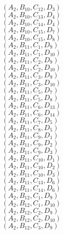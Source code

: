 \documentclass[14pt]{article}
\begin{document}
    $({A}_{2}, {B}_{10}, {C}_{12}, {D}_{3}) $ \\ 
    $({A}_{2}, {B}_{10}, {C}_{13}, {D}_{4}) $ \\ 
    $({A}_{2}, {B}_{10}, {C}_{14}, {D}_{4}) $ \\ 
    $({A}_{2}, {B}_{10}, {C}_{15}, {D}_{7}) $ \\ 
    $({A}_{2}, {B}_{10}, {C}_{15}, {D}_{8}) $ \\ 
    $({A}_{2}, {B}_{11}, {C}_{1}, {D}_{9}) $ \\ 
    $({A}_{2}, {B}_{11}, {C}_{1}, {D}_{10}) $ \\ 
    $({A}_{2}, {B}_{11}, {C}_{2}, {D}_{9}) $ \\ 
    $({A}_{2}, {B}_{11}, {C}_{2}, {D}_{10}) $ \\ 
    $({A}_{2}, {B}_{11}, {C}_{3}, {D}_{9}) $ \\ 
    $({A}_{2}, {B}_{11}, {C}_{3}, {D}_{10}) $ \\ 
    $({A}_{2}, {B}_{11}, {C}_{5}, {D}_{7}) $ \\ 
    $({A}_{2}, {B}_{11}, {C}_{5}, {D}_{8}) $ \\ 
    $({A}_{2}, {B}_{11}, {C}_{6}, {D}_{13}) $ \\ 
    $({A}_{2}, {B}_{11}, {C}_{6}, {D}_{14}) $ \\ 
    $({A}_{2}, {B}_{11}, {C}_{7}, {D}_{5}) $ \\ 
    $({A}_{2}, {B}_{11}, {C}_{8}, {D}_{5}) $ \\ 
    $({A}_{2}, {B}_{11}, {C}_{9}, {D}_{1}) $ \\ 
    $({A}_{2}, {B}_{11}, {C}_{9}, {D}_{2}) $ \\ 
    $({A}_{2}, {B}_{11}, {C}_{9}, {D}_{3}) $ \\ 
    $({A}_{2}, {B}_{11}, {C}_{10}, {D}_{1}) $ \\ 
    $({A}_{2}, {B}_{11}, {C}_{10}, {D}_{2}) $ \\ 
    $({A}_{2}, {B}_{11}, {C}_{10}, {D}_{3}) $ \\ 
    $({A}_{2}, {B}_{11}, {C}_{13}, {D}_{6}) $ \\ 
    $({A}_{2}, {B}_{11}, {C}_{14}, {D}_{6}) $ \\ 
    $({A}_{2}, {B}_{12}, {C}_{1}, {D}_{9}) $ \\ 
    $({A}_{2}, {B}_{12}, {C}_{1}, {D}_{10}) $ \\ 
    $({A}_{2}, {B}_{12}, {C}_{2}, {D}_{9}) $ \\ 
    $({A}_{2}, {B}_{12}, {C}_{2}, {D}_{10}) $ \\ 
    $({A}_{2}, {B}_{12}, {C}_{3}, {D}_{9}) $ \\ 
\end{document}
